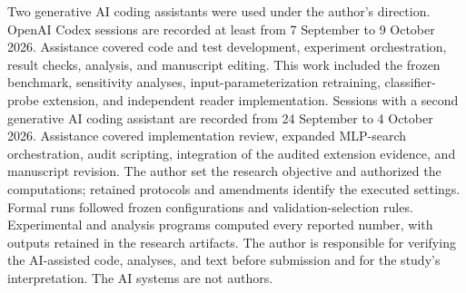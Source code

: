 Two generative AI coding assistants were used under the author's direction. OpenAI Codex sessions are recorded at least from 7 September to 9 October 2026. Assistance covered code and test development, experiment orchestration, result checks, analysis, and manuscript editing. This work included the frozen benchmark, sensitivity analyses, input-parameterization retraining, classifier-probe extension, and independent reader implementation. Sessions with a second generative AI coding assistant are recorded from 24 September to 4 October 2026. Assistance covered implementation review, expanded MLP-search orchestration, audit scripting, integration of the audited extension evidence, and manuscript revision. The author set the research objective and authorized the computations; retained protocols and amendments identify the executed settings. Formal runs followed frozen configurations and validation-selection rules. Experimental and analysis programs computed every reported number, with outputs retained in the research artifacts. The author is responsible for verifying the AI-assisted code, analyses, and text before submission and for the study's interpretation. The AI systems are not authors.
